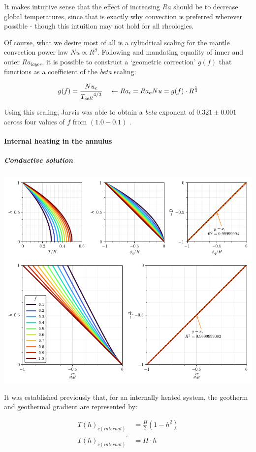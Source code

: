 \documentclass[a4paper,11pt,oneside]{book}
\begin{document}
It makes intuitive sense that the effect of increasing $Ra$ should be to decrease global temperatures, since that is exactly why convection is preferred wherever possible - though this intuition may not hold for all rheologies.

Of course, what we desire most of all is a cylindrical scaling for the mantle convection power law $Nu \propto R^{\beta}$. Following \cite{Jarvis1993-cb} and mandating equality of inner and outer $Ra_{layer}$, it is possible to construct a `geometric correction' $g(f)$ that functions as a coefficient of the \textit{beta} scaling:

\begin{equation}
g(f) = \frac{Nu_{c}}{{T_{cell}}^{4/3}} \quad \leftarrow Ra_i = Ra_o \\
Nu = g(f) \cdot R^{\frac{1}{3}}
\end{equation}

Using this scaling, Jarvis was able to obtain a \textit{beta} exponent of $0.321 \pm 0.001$ across four values of $f$ from $(1.0 - 0.1)$ \cite{Jarvis1993-cb}.

\paragraph{Internal heating in the annulus}

\subparagraph{Conductive solution}

\includegraphics[width=0.7\linewidth]{files/0a5abf12a1f99d470b669652116b36ed.png}

It was established previously that, for an internally heated system, the geotherm and geothermal gradient are represented by:

\begin{align*}
{T(h)}_{c(internal)} &= \frac{H}{2} \left( 1 - h^2 \right) \\
{{T(h)}_{c(internal)}}^{'} &= H\cdot h
\end{align*}
\end{document}
